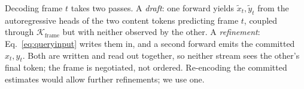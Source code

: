 Decoding frame $t$ takes two passes. A \emph{draft}: one forward yields
$\tilde{x}_t, \tilde{y}_t$ from the autoregressive heads of the two
content tokens predicting frame $t$, coupled through
$\mathcal{K}_{\text{frame}}$ but with neither observed by the other. A
\emph{refinement}: Eq.~\eqref{eq:queryinput} writes them in, and a
second forward emits the committed $x_t, y_t$. Both are written and
read out together, so neither stream sees the other's final token; the
frame is negotiated, not ordered. Re-encoding the committed estimates
would allow further refinements; we use one.

